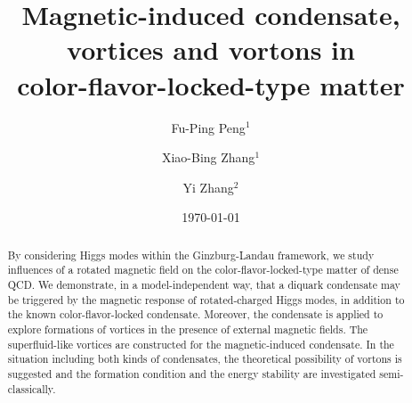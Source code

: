 \documentclass[prd, showpacs,nofootinbib,amsmath,amssymb]{revtex4}
\begin{document}
\title{Magnetic-induced condensate, vortices and vortons in\\
	 color-flavor-locked-type matter}
\author{Fu-Ping Peng$^1$}
\author{Xiao-Bing Zhang$^1$}
\author{Yi Zhang$^2$}

\date{\today}

\begin{abstract}
By considering Higgs modes within the Ginzburg-Landau framework, we study influences of a rotated magnetic field on
the color-flavor-locked-type matter of dense QCD. We demonstrate, in a model-independent way, that a diquark condensate
may be triggered by the magnetic response of rotated-charged Higgs modes, in addition to the known color-flavor-locked 
condensate.
Moreover, the condensate is applied to explore formations of vortices in the presence of external magnetic fields. The superfluid-like vortices are constructed for the magnetic-induced condensate. In the situation including both kinds of condensates, the theoretical possibility of vortons is suggested and the formation condition and the energy stability are investigated semi-classically.

\end{abstract}

\maketitle

\end{document}
